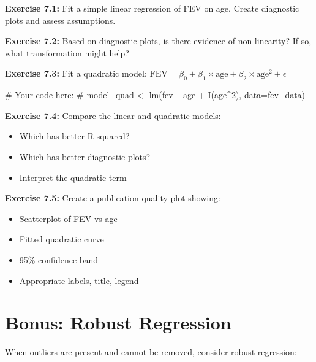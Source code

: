 \documentclass[11pt]{article}
\begin{document}
\textbf{Exercise 7.1:} Fit a simple linear regression of FEV on age. Create diagnostic plots and assess assumptions.

\vspace{1cm}

\textbf{Exercise 7.2:} Based on diagnostic plots, is there evidence of non-linearity? If so, what transformation might help?

\vspace{1cm}

\textbf{Exercise 7.3:} Fit a quadratic model: $\text{FEV} = \beta_0 + \beta_1 \times \text{age} + \beta_2 \times \text{age}^2 + \epsilon$

\begin{rcode}
# Your code here:
# model_quad <- lm(fev ~ age + I(age^2), data=fev_data)
\end{rcode}

\vspace{1cm}

\textbf{Exercise 7.4:} Compare the linear and quadratic models:
\begin{itemize}
\item Which has better R-squared?
\item Which has better diagnostic plots?
\item Interpret the quadratic term
\end{itemize}

\vspace{1.5cm}

\textbf{Exercise 7.5:} Create a publication-quality plot showing:
\begin{itemize}
\item Scatterplot of FEV vs age
\item Fitted quadratic curve
\item 95\% confidence band
\item Appropriate labels, title, legend
\end{itemize}

\vspace{1cm}

\section{Bonus: Robust Regression}

When outliers are present and cannot be removed, consider robust regression:

\end{document}
